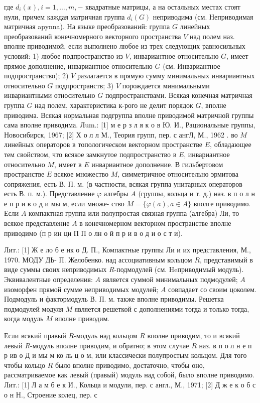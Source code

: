 \documentclass[10pt]{article}
\begin{document}
где $d_{i}(x), i=1, \ldots, m,-$ квадратные матрицы, а на остальных местах стоят нули, причем каждая матричная группа $d_{i}(G)$ неприводима (см. Неприводимая матричная apynna). На языке преобразований: группа $G$ линейных преобразований конечномерного векторного пространства $V$ над полем наз. вполне приводимой, если выполнено любое из трех следующих равносильных условий: 1) любое подпространство из $V$, инвариантное относительно $G$, имеет прямое дополнение, инвариантное относительно $G$ (см. Инвариантное подпространство); 2) $V$ разлагается в прямую сумму минимальных инвариантных относительно $G$ подпространств; 3) $V$ порождается минимальными инвариантными относительно $G$ подпространствами. Всякая конечная матричная группа $G$ над полем, характеристика к-рого не делит порядок $G$, вполне приводима. Всякая нормальная подгруппа вполне приводимой матричной группы сама вполне приводима. Лum.: [1] м е р з л я к о в Ю. И., Рациональные группы, Новосибирск, 1967; [2] Х о л л М., Теория групп, пер. с ангЛ, М., 1962 . во $M$ линейных операторов в топологическом векторном пространстве $E$, обладающее тем свойством, что всякое замкнутое подпространство в $E$, инвариантное относительно $M$, имеет в $E$ инвариантное дополнение. В гильбертовом пространстве $E$ всякое множество $M$, симметричное относительно эрмитова сопряжения, есть В. П. м. (в частности, всякая группа унитарных операторов есть В. п. м.). Представление $\varphi$ алгебры $A$ (группы, кольца и т. д.) наз. в п о л н е п р и в о д и мы м, если множе- ство $M=\{\varphi(a), a \in A\}$ вполге приводимо. Если $A$ компактная группа или полупростая связная группа (алгебра) Ли, то всякое представление $A$ в конечномерном векторном пространстве вполне приводимо (п р ин ци П П о лн о й п р и в о д и о с т и).



Лит.: [1] Ж е ло б е нк о Д. П., Компактные группы Ли и их представления, М., 1970. МОДУ ДЬ- П. Желобенко. над ассоциативным кольцом $R$, представимый в виде суммы своих неприводимых $R$-подмодулей (см. Heприводимый модуль). Эквивалентные определения: $A$ является суммой минимальных подмодулей; $A$ изоморфен прямой сумме неприводимых модулей; $A$ совпадает со своим цоколем. Подмодуль и фактормодуль В. П. м. также вполне приводимы. Решетка подмодулей модуля $M$ является решеткой с дополнениями тогда и только тогда, когда модуль $M$ вполне приводим.



Если всякий правый $R$-модуль над кольцом $R$ вполне приводим, то и всякий левый $R$-модуль вполне приводим, и обратно; в этом случае $R$ наз. в п о л н е п р ив о Д и мы м ко ль ц о м, или классически полупростым кольцом. Для того чтобы кольцо $R$ было вполне приводимо, достаточно, чтобы оно, рассматриваемое как левый (правый) модуль над собой, было вполне приводимо. Лит.: [1] Л а м б е к И., Кольца и модули, пер. с англ., М., 1971; [2] Д ж е к о б с о н Н., Строение колец, пер. с
\end{document}
